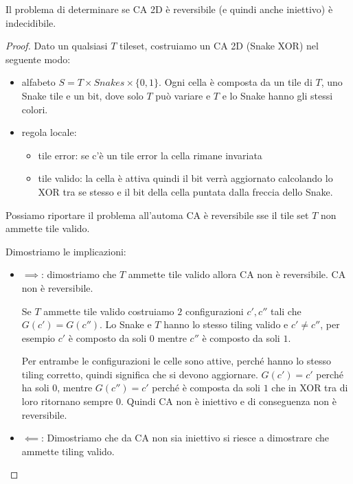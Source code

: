 \begin{teorema}
    Il problema di determinare se CA 2D è reversibile (e quindi anche iniettivo)
    è indecidibile.
    \begin{proof}
        Dato un qualsiasi $T$ tileset, costruiamo un CA 2D (Snake XOR) nel seguente modo:
        \begin{itemize}
            \item alfabeto $S = T\times Snakes\times \{0,1\}$. Ogni cella è composta
                  da un tile di $T$, uno Snake tile e un bit, dove solo $T$ può variare e
                  $T$ e lo Snake hanno gli stessi colori.
            \item regola locale:
                  \begin{itemize}
                      \item tile error: se c'è un tile error la cella rimane invariata
                      \item tile valido: la cella è attiva quindi il bit verrà aggiornato
                            calcolando lo XOR tra se stesso e il bit della cella puntata dalla
                            freccia dello Snake.
                  \end{itemize}
        \end{itemize}

        Possiamo riportare il problema all'automa CA è reversibile sse il tile
        set $T$ non ammette tile valido.

        Dimostriamo le implicazioni:
        \begin{itemize}
            \item $\implies$: dimostriamo che $T$ ammette tile valido allora
                  CA non è reversibile.
                  CA non è reversibile.

                  Se $T$ ammette tile valido costruiamo $2$ configurazioni $c', c''$
                  tali che $G(c') = G(c'')$. Lo Snake e $T$ hanno lo stesso tiling valido
                  e $c'\ne c''$, per esempio $c'$ è composto da soli $0$ mentre $c''$
                  è composto da soli $1$.

                  Per entrambe le configurazioni le celle sono attive, perché
                  hanno lo stesso tiling corretto, quindi significa che si devono aggiornare.
                  $G(c') = c'$ perché ha soli $0$, mentre $G(c'') = c'$ perché è composta
                  da soli $1$ che in XOR tra di loro ritornano sempre $0$. Quindi CA non
                  è iniettivo e di conseguenza non è reversibile.
            \item $\impliedby$: Dimostriamo che da CA non sia iniettivo si riesce
                  a dimostrare che ammette tiling valido.


\end{itemize}
\end{proof}
\end{teorema}
